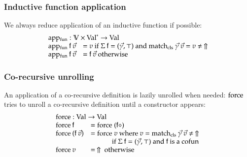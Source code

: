 \subsubsection{Inductive function application}
We always reduce application of an inductive function if possible:\[
\begin{array}{ll}
\multicolumn{2}{l}{\apf : \cV \times \ves{\Val} \ra \Val}\\
\apf \: \ff \: \vec{v} & = v \mbox{ if } \Sig \: \ff = (\vec{\gamma},\top) \mbox { and } \matchcls \: \vec{\gamma} \: \vec{v} = v \neq \stuck \\ 
\apf \: \ff \: \vec{v} & = \ff \: \vec{v} \mbox { otherwise } 
\end{array}
\]


\subsubsection{Co-recursive unrolling}
An application of a co-recursive definition is lazily unrolled when needed: 
$\mathrm{force}$ tries to unroll a co-recursive definition until a constructor appears:
\[
\begin{array}{ll}
\multicolumn{2}{l}{\forc : \Val \ra \Val }\\
\forc \: \ff & = \forc \; (\ff \diamond) \\
\forc \: (\ff \: \vec{v}) & = \forc \; v \mbox{ where } v = \matchcls \: \vec{\gamma} \: \vec{v} \neq \stuck \:\\
& \spcx \mbox{ if } \Sig \: \ff = (\vec{\gamma},\top) \mbox { and } \ff \mbox { is a } \cofun\\ 
\forc \: v & = \stuck \mbox{ otherwise}
\end{array}
\]


